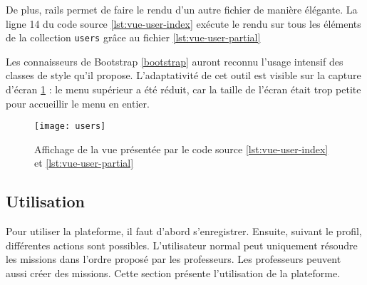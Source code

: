 \begin{figure}

\end{figure}
De plus, \gls{rails} permet de faire le rendu d'un autre fichier de manière élégante. La ligne 14 du code source \ref{lst:vue-user-index} exécute le rendu sur tous les éléments de la collection \texttt{users} grâce au fichier \ref{lst:vue-user-partial}

Les connaisseurs de Bootstrap \ref{bootstrap} auront reconnu l'usage intensif des classes de style qu'il propose. L'adaptativité de cet outil est visible sur la capture d'écran \ref{fig:vue-users} : le menu supérieur a été réduit, car la taille de l'écran était trop petite pour accueillir le menu en entier.

\begin{figure}
  \begin{center}
    \texttt{[image: users]}
    \caption{Affichage de la vue présentée par le code source \ref{lst:vue-user-index} et \ref{lst:vue-user-partial}}
    \label{fig:vue-users}
  \end{center}
\end{figure}

\subsection{Utilisation}
Pour utiliser la plateforme, il faut d'abord s'enregistrer. Ensuite, suivant le profil, différentes actions sont possibles. L'utilisateur normal peut uniquement résoudre les \glspl{mission} dans l'ordre proposé par les professeurs. Les professeurs peuvent aussi créer des \glspl{mission}. Cette section présente l'utilisation de la plateforme.

